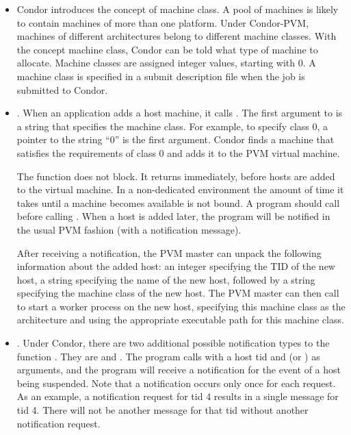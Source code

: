 \begin{itemize}

\item Condor introduces the concept of machine class.
  A pool of machines is likely to contain machines of more than
  one platform.
  Under Condor-PVM, machines of
  different architectures belong to different machine classes.
  With the concept machine class,
  Condor can be told what type
  of machine to allocate.
  Machine classes are assigned integer values, starting with 0.
  A machine class is
  specified in a submit description file when the job
  is submitted to Condor.

\item {}.  When an application
  adds a host machine, it calls .
  The first argument to 
  is a string that specifies the machine class.
  For example, to specify class 0, a pointer to the string ``0''
  is the first argument.  Condor finds a machine
  that satisfies the requirements of class 0 and adds it to the PVM
  virtual machine.

  The function  does not block.  It
  returns immediately, before hosts are added to the virtual
  machine.  
  In a non-dedicated environment the amount of time it takes until
  a machine becomes available is not bound.
  A program should call 
   before calling
  . When a host is added later, the program
  will be notified in the usual PVM 
  fashion (with a  notification message).

  After receiving a  notification, the PVM master can
  unpack the following information about the added host: an integer
  specifying the TID of the new host, a string specifying the name of
  the new host, followed by a string specifying the machine class of
  the new host.  The PVM master can then call  to
  start a worker process on the new host, specifying this machine
  class as the architecture and using the appropriate executable path
  for this machine class.
    

\item {}.  Under Condor, there are two additional 
  possible notification types
  to the function .
  They are  and
  .
  The program calls 
  with a host tid and  (or )
  as arguments, and the program will receive
  a notification for the event of a host being suspended.
  Note that a notification occurs only once for each request.
  As an example,
  a  
  notification request for tid 4 results in a single 
  message for tid 4. 
  There will not be another  message for
  that tid without another notification request.


\end{itemize}
